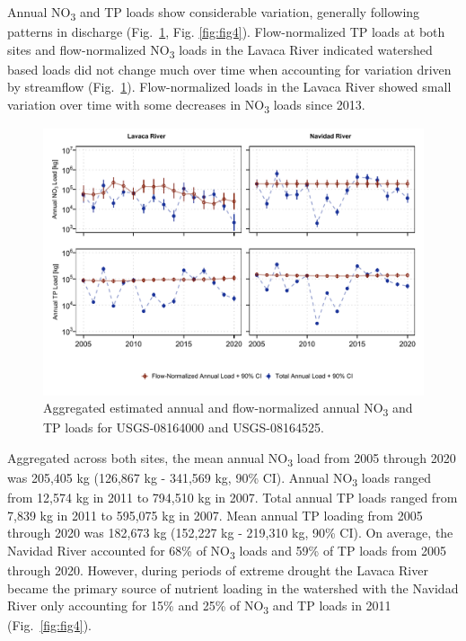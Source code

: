 \documentclass[fleqn,10pt,lineno]{wlpeerj} %
\providecommand{\DIFaddbeginFL}{} %
\providecommand{\DIFaddendFL}{} %
\providecommand{\DIFdelbeginFL}{} %
\providecommand{\DIFdelendFL}{} %
\begin{document}
Annual NO\textsubscript{3} and TP loads show considerable variation,
generally following patterns in discharge (Fig.~\ref{fig:fig3}, Fig.
\ref{fig:fig4}). Flow-normalized TP loads at both sites and
flow-normalized NO\textsubscript{3} loads in the Lavaca River indicated
watershed based loads did not change much over time when accounting for
variation driven by streamflow (Fig.~\ref{fig:fig3}). Flow-normalized
loads in the Lavaca River showed small variation over time with some
decreases in NO\textsubscript{3} loads since 2013.

\begin{figure}

{\centering \DIFdelbeginFL %
\DIFdelendFL \DIFaddbeginFL \includegraphics[width=1\linewidth,]{Schramm-2023-08-PeerJ_files/figure-latex/fig3} 
\DIFaddendFL 

}

\caption{Aggregated estimated annual and flow-normalized annual NO\textsubscript{3} and TP loads for USGS-08164000 and USGS-08164525.}\label{fig:fig3}
\end{figure}

Aggregated across both sites, the mean annual NO\textsubscript{3} load
from 2005 through 2020 was 205,405 kg (126,867 kg - 341,569 kg, 90\%
CI). Annual NO\textsubscript{3} loads ranged from 12,574 kg in 2011 to
794,510 kg in 2007. Total annual TP loads ranged from 7,839 kg in 2011
to 595,075 kg in 2007. Mean annual TP loading from 2005 through 2020 was
182,673 kg (152,227 kg - 219,310 kg, 90\% CI). On average, the Navidad
River accounted for 68\% of NO\textsubscript{3} loads and 59\% of TP
loads from 2005 through 2020. However, during periods of extreme drought
the Lavaca River became the primary source of nutrient loading in the
watershed with the Navidad River only accounting for 15\% and 25\% of
NO\textsubscript{3} and TP loads in 2011 (Fig.~\ref{fig:fig4}).
\end{document}
